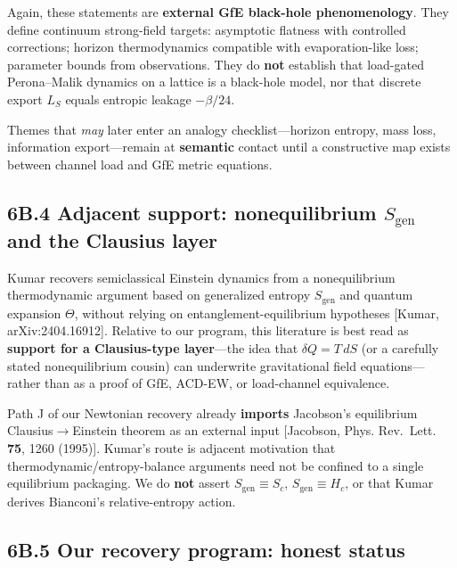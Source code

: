 \documentclass[
  11pt,
]{article}
\newcounter{none} %
\begin{document}
Again, these statements are \textbf{external GfE black-hole phenomenology}. They define continuum strong-field targets: asymptotic flatness with controlled corrections; horizon thermodynamics compatible with evaporation-like loss; parameter bounds from observations. They do \textbf{not} establish that load-gated Perona--Malik dynamics on a lattice is a black-hole model, nor that discrete export \(L_S\) equals entropic leakage \(-\beta/24\).

Themes that \emph{may} later enter an analogy checklist---horizon entropy, mass loss, information export---remain at \textbf{semantic} contact until a constructive map exists between channel load and GfE metric equations.

\subsection{\texorpdfstring{6B.4 Adjacent support: nonequilibrium \(S_{\mathrm{gen}}\) and the Clausius layer}{6B.4 Adjacent support: nonequilibrium S\_\{\textbackslash mathrm\{gen\}\} and the Clausius layer}}\label{b.4-adjacent-support-nonequilibrium-s_mathrmgen-and-the-clausius-layer}

Kumar recovers semiclassical Einstein dynamics from a nonequilibrium thermodynamic argument based on generalized entropy \(S_{\mathrm{gen}}\) and quantum expansion \(\Theta\), without relying on entanglement-equilibrium hypotheses {[}Kumar, arXiv:2404.16912{]}. Relative to our program, this literature is best read as \textbf{support for a Clausius-type layer}---the idea that \(\delta Q=T\,dS\) (or a carefully stated nonequilibrium cousin) can underwrite gravitational field equations---rather than as a proof of GfE, ACD-EW, or load-channel equivalence.

Path J of our Newtonian recovery already \textbf{imports} Jacobson's equilibrium Clausius$\rightarrow$Einstein theorem as an external input {[}Jacobson, Phys. Rev.~Lett. \textbf{75}, 1260 (1995){]}. Kumar's route is adjacent motivation that thermodynamic/entropy-balance arguments need not be confined to a single equilibrium packaging. We do \textbf{not} assert \(S_{\mathrm{gen}}\equiv S_c\), \(S_{\mathrm{gen}}\equiv H_c\), or that Kumar derives Bianconi's relative-entropy action.

\subsection{6B.5 Our recovery program: honest status}\label{b.5-our-recovery-program-honest-status}
\end{document}

